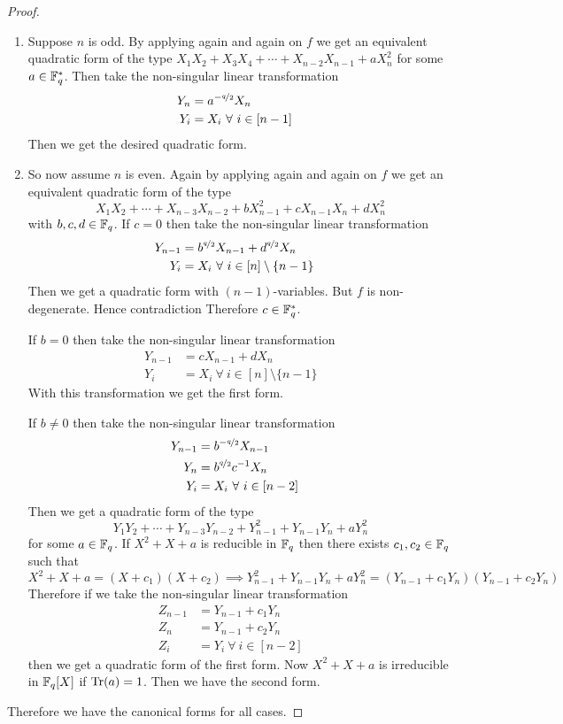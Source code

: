 \begin{proof}
  \begin{enumerate}[label=(\roman*)]
    \item Suppose $n$ is odd. By applying \QFRedEvenlem again and again on $f$ we get an equivalent quadratic form of the type $X_1X_2+X_3X_4+\cdots +X_{n-2}X_{n-1}+aX_n^2$ for some $a\in\mathbb{F}_q^*$. Then take the non-singular linear transformation
    \begin{align*}
      Y_n& = a^{-\nicefrac{q}{2}}X_n&&\\ 
      Y_i& = X_i\ \forall\ i\in[n-1]&&
    \end{align*}
    Then we get the desired quadratic form. 
    \item So now assume $n$ is even. Again by applying \QFRedEvenlem again and again on $f$ we get an equivalent quadratic form of the type $$X_1X_2+\cdots+X_{n-3}X_{n-2}+bX_{n-1}^2+cX_{n-1}X_n+dX_n^2$$with $b,c,d\in\mathbb{F}_q$. If $c=0$ then take the non-singular linear transformation
    \begin{align*}
      Y_{n-1}& = b^{\nicefrac{q}2}X_{n-1}+d^{\nicefrac{q}2}X_n&&\\ 
      Y_i& = X_i\ \forall\ i\in[n]\setminus\{n-1\}&&
    \end{align*}Then we get a quadratic form with $(n-1)$-variables. But $f$ is non-degenerate. Hence contradiction \ctr Therefore $c\in\mathbb{F}_q^*$. 
    
    If $b=0$ then take the non-singular linear transformation 
      \begin{align*}
      Y_{n-1}& = cX_{n-1}+dX_n&&\\ 
      Y_i& = X_i\ \forall\ i\in[n]\setminus\{n-1\}&&
    \end{align*}With this transformation we get the first form. 
    
    
    If $b\neq 0$ then take the non-singular linear transformation
    \begin{align*}
      Y_{n-1}& = b^{-\nicefrac{q}2}X_{n-1}&&\\
      Y_n & = b^{\nicefrac{q}2}c^{-1}X_n && \\ 
      Y_i& = X_i\ \forall\ i\in[n-2]&&
    \end{align*}Then we get a quadratic form of the type $$Y_1Y_2+\cdots+Y_{n-3}Y_{n-2}+Y_{n-1}^2+Y_{n-1}Y_n+aY_n^2$$for some $a\in\mathbb{F}_q$. If $X^2+X+a$ is reducible in $\mathbb{F}_q$ then there exists $c_1,c_2\in\mathbb{F}_q$ such that $$X^2+X+a=(X+c_1)(X+c_2)\implies Y_{n-1}^2+Y_{n-1}Y_n+aY_n^2=(Y_{n-1}+c_1Y_n)(Y_{n-1}+c_2Y_n)$$Therefore if we take the non-singular linear transformation 
    \begin{align*}
      Z_{n-1}& = Y_{n-1}+c_1Y_n&&\\
      Z_n & = Y_{n-1}+c_2Y_n && \\ 
      Z_i& = Y_i\ \forall\ i\in[n-2]&&
    \end{align*}then we get a quadratic form of the first form. Now $X^2+X+a$ is irreducible in $\mathbb{F}_q[X]$ if  $\operatorname{Tr}(a)=1$. Then we have the second form. 
  \end{enumerate}
  Therefore we have the canonical forms for all cases. 
\end{proof}
